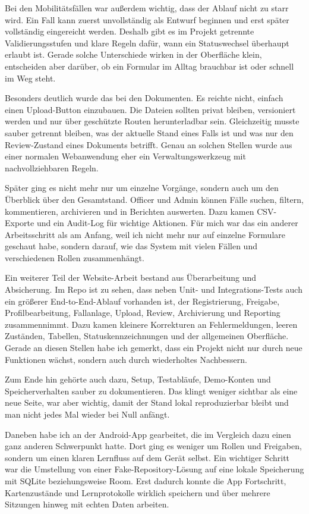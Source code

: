 \documentclass{Vorlage}
\begin{document}
Bei den Mobilit\"atsf\"allen war au\ss{}erdem wichtig, dass der Ablauf nicht zu starr wird. Ein Fall kann zuerst unvollst\"andig als Entwurf beginnen und erst sp\"ater vollst\"andig eingereicht werden. Deshalb gibt es im Projekt getrennte Validierungsstufen und klare Regeln daf\"ur, wann ein Statuswechsel \"uberhaupt erlaubt ist. Gerade solche Unterschiede wirken in der Oberfl\"ache klein, entscheiden aber dar\"uber, ob ein Formular im Alltag brauchbar ist oder schnell im Weg steht.

Besonders deutlich wurde das bei den Dokumenten. Es reichte nicht, einfach einen Upload-Button einzubauen. Die Dateien sollten privat bleiben, versioniert werden und nur \"uber gesch\"utzte Routen herunterladbar sein. Gleichzeitig musste sauber getrennt bleiben, was der aktuelle Stand eines Falls ist und was nur den Review-Zustand eines Dokuments betrifft. Genau an solchen Stellen wurde aus einer normalen Webanwendung eher ein Verwaltungswerkzeug mit nachvollziehbaren Regeln.

Sp\"ater ging es nicht mehr nur um einzelne Vorg\"ange, sondern auch um den \"Uberblick \"uber den Gesamtstand. Officer und Admin k\"onnen F\"alle suchen, filtern, kommentieren, archivieren und in Berichten auswerten. Dazu kamen CSV-Exporte und ein Audit-Log f\"ur wichtige Aktionen. F\"ur mich war das ein anderer Arbeitsschritt als am Anfang, weil ich nicht mehr nur auf einzelne Formulare geschaut habe, sondern darauf, wie das System mit vielen F\"allen und verschiedenen Rollen zusammenh\"angt.

Ein weiterer Teil der Website-Arbeit bestand aus \"Uberarbeitung und Absicherung. Im Repo ist zu sehen, dass neben Unit- und Integrations-Tests auch ein gr\"o\ss{}erer End-to-End-Ablauf vorhanden ist, der Registrierung, Freigabe, Profilbearbeitung, Fallanlage, Upload, Review, Archivierung und Reporting zusammennimmt. Dazu kamen kleinere Korrekturen an Fehlermeldungen, leeren Zust\"anden, Tabellen, Statuskennzeichnungen und der allgemeinen Oberfl\"ache. Gerade an diesen Stellen habe ich gemerkt, dass ein Projekt nicht nur durch neue Funktionen w\"achst, sondern auch durch wiederholtes Nachbessern.

Zum Ende hin geh\"orte auch dazu, Setup, Testabl\"aufe, Demo-Konten und Speicherverhalten sauber zu dokumentieren. Das klingt weniger sichtbar als eine neue Seite, war aber wichtig, damit der Stand lokal reproduzierbar bleibt und man nicht jedes Mal wieder bei Null anf\"angt.

Daneben habe ich an der Android-App gearbeitet, die im Vergleich dazu einen ganz anderen Schwerpunkt hatte. Dort ging es weniger um Rollen und Freigaben, sondern um einen klaren Lernfluss auf dem Ger\"at selbst. Ein wichtiger Schritt war die Umstellung von einer Fake-Repository-L\"osung auf eine lokale Speicherung mit SQLite beziehungsweise Room. Erst dadurch konnte die App Fortschritt, Kartenzust\"ande und Lernprotokolle wirklich speichern und \"uber mehrere Sitzungen hinweg mit echten Daten arbeiten.
\end{document}
